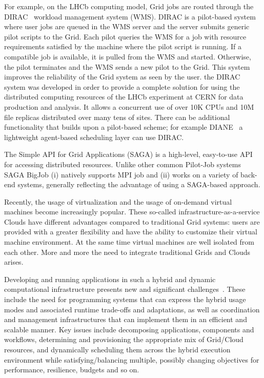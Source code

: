 \documentclass[conference,final]{IEEEtran}
\begin{document}
For example, on the LHCb computing model, Grid jobs are routed through
the DIRAC~\cite{dirac} workload management system (WMS). DIRAC is a
pilot-based system where user jobs are queued in the WMS server and
the server submits generic pilot scripts to the Grid. Each pilot
queries the WMS for a job with resource requirements satisfied by the
machine where the pilot script is running. If a compatible job is
available, it is pulled from the WMS and started. Otherwise, the pilot
terminates and the WMS sends a new pilot to the Grid. This system
improves the reliability of the Grid system as seen by the user.  the
DIRAC system was developed in order to provide a complete solution for
using the distributed computing resources of the LHCb experiment at
CERN for data production and analysis. It allows a concurrent use of
over 10K CPUs and 10M file replicas distributed over many tens of
sites.  There can be additional functionality that builds upon a
pilot-based scheme; for example DIANE~\cite{diane} a lightweight
agent-based scheduling layer can use DIRAC.

The Simple API for Grid Applications (SAGA) is a high-level,
easy-to-use API for accessing distributed resources. Unlike other
common Pilot-Job systems SAGA BigJob (i) natively supports MPI job and
(ii) works on a variety of back-end systems, generally reflecting the
advantage of using a SAGA-based approach.

Recently, the usage of virtualization and the usage of on-demand
virtual machines become increasingly popular. These so-called
infrastructure-as-a-service Clouds have different advantages compared
to traditional Grid systems: users are provided with a greater
flexibility and have the ability to customize their virtual machine
environment. At the same time virtual machines are well isolated from
each other. More and more the need to integrate traditional Grids and
Clouds arises.

Developing and running applications in such a hybrid and dynamic
computational infrastructure presents new and significant
challenges~\cite{cloud-grid-autonomics}. These include the need for
programming systems that can express the hybrid usage modes and
associated runtime trade-offs and adaptations, as well as coordination
and management infrastructures that can implement them in an efficient
and scalable manner. Key issues include decomposing applications,
components and workflows, determining and provisioning the appropriate
mix of Grid/Cloud resources, and dynamically scheduling them across
the hybrid execution environment while satisfying/balancing multiple,
possibly changing objectives for performance, resilience, budgets and
so on.
\end{document}

